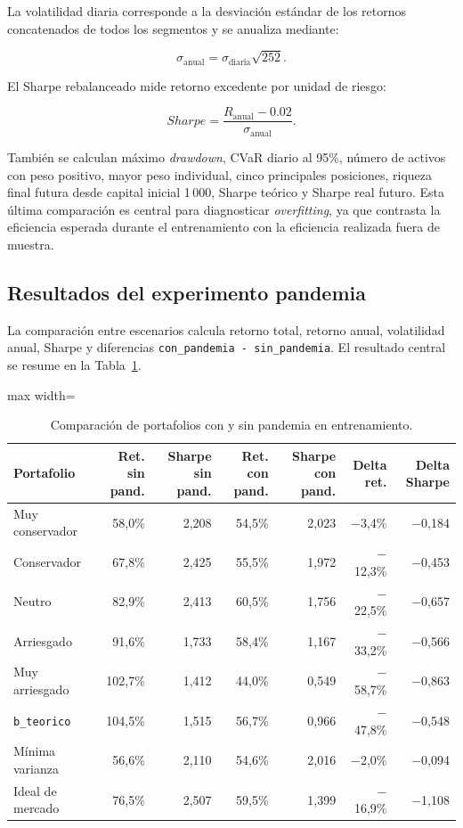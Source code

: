 La volatilidad diaria corresponde a la desviaci\'on est\'andar de los retornos
concatenados de todos los segmentos y se anualiza mediante:

\begin{equation}
\sigma_{\text{anual}} = \sigma_{\text{diaria}}\sqrt{252}.
\end{equation}

El Sharpe rebalanceado mide retorno excedente por unidad de riesgo:

\begin{equation}
Sharpe = \frac{R_{\text{anual}} - 0.02}{\sigma_{\text{anual}}}.
\end{equation}

Tambi\'en se calculan m\'aximo \textit{drawdown}, CVaR diario al 95\%, n\'umero
de activos con peso positivo, mayor peso individual, cinco principales
posiciones, riqueza final futura desde capital inicial 1\,000, Sharpe te\'orico
y Sharpe real futuro. Esta \'ultima comparaci\'on es central para diagnosticar
\textit{overfitting}, ya que contrasta la eficiencia esperada durante el
entrenamiento con la eficiencia realizada fuera de muestra.

\subsection*{Resultados del experimento pandemia}

La comparaci\'on entre escenarios calcula retorno total, retorno anual,
volatilidad anual, Sharpe y diferencias
\texttt{con\_pandemia - sin\_pandemia}. El resultado central se resume en la
Tabla~\ref{tab:anexo4_comparacion_pandemia}.

\begin{table}[H]
\centering
\caption{Comparaci\'on de portafolios con y sin pandemia en entrenamiento.}
\label{tab:anexo4_comparacion_pandemia}
\scriptsize
\begin{adjustbox}{max width=\textwidth}
\begin{tabular}{@{}lrrrrrr@{}}
\toprule
Portafolio & Ret. sin pand. & Sharpe sin pand. & Ret. con pand. & Sharpe con pand. & Delta ret. & Delta Sharpe \\
\midrule
Muy conservador & 58,0\% & 2,208 & 54,5\% & 2,023 & $-$3,4\% & $-$0,184 \\
Conservador & 67,8\% & 2,425 & 55,5\% & 1,972 & $-$12,3\% & $-$0,453 \\
Neutro & 82,9\% & 2,413 & 60,5\% & 1,756 & $-$22,5\% & $-$0,657 \\
Arriesgado & 91,6\% & 1,733 & 58,4\% & 1,167 & $-$33,2\% & $-$0,566 \\
Muy arriesgado & 102,7\% & 1,412 & 44,0\% & 0,549 & $-$58,7\% & $-$0,863 \\
\texttt{b\_teorico} & 104,5\% & 1,515 & 56,7\% & 0,966 & $-$47,8\% & $-$0,548 \\
M\'inima varianza & 56,6\% & 2,110 & 54,6\% & 2,016 & $-$2,0\% & $-$0,094 \\
Ideal de mercado & 76,5\% & 2,507 & 59,5\% & 1,399 & $-$16,9\% & $-$1,108 \\
\bottomrule
\end{tabular}
\end{adjustbox}
\end{table}

